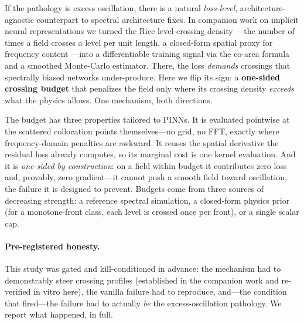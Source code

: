 \documentclass[10pt]{article}
\begin{document}
If the pathology is excess oscillation, there is a natural \emph{loss-level},
architecture-agnostic counterpart to spectral architecture fixes. In companion work
on implicit neural representations \citep{howe2026levelcrossing} we turned the Rice
level-crossing density \citep{rice1944,kac1943}---the number of times a field
crosses a level per unit length, a closed-form spatial proxy for frequency content
\citep{kedem1986zerocrossings}---into a differentiable training signal via the
co-area formula and a smoothed Monte-Carlo estimator. There, the loss \emph{demands}
crossings that spectrally biased networks under-produce. Here we flip its sign: a
\textbf{one-sided crossing budget} that penalizes the field only where its crossing
density \emph{exceeds} what the physics allows. One mechanism, both directions.

The budget has three properties tailored to PINNs. It is evaluated pointwise at the
scattered collocation points themselves---no grid, no FFT, exactly where
frequency-domain penalties are awkward. It reuses the spatial derivative the residual
loss already computes, so its marginal cost is one kernel evaluation. And it is
\emph{one-sided by construction}: on a field within budget it contributes zero loss
and, provably, zero gradient---it cannot push a smooth field toward oscillation, the
failure it is designed to prevent. Budgets come from three sources of decreasing
strength: a reference spectral simulation, a closed-form physics prior (for a
monotone-front class, each level is crossed once per front), or a single scalar cap.

\paragraph{Pre-registered honesty.} This study was gated and kill-conditioned in
advance: the mechanism had to demonstrably steer crossing profiles (established in
the companion work and re-verified in vitro here), the vanilla failure had to
reproduce, and---the condition that fired---the failure had to actually \emph{be}
the excess-oscillation pathology. We report what happened, in full.
\end{document}
